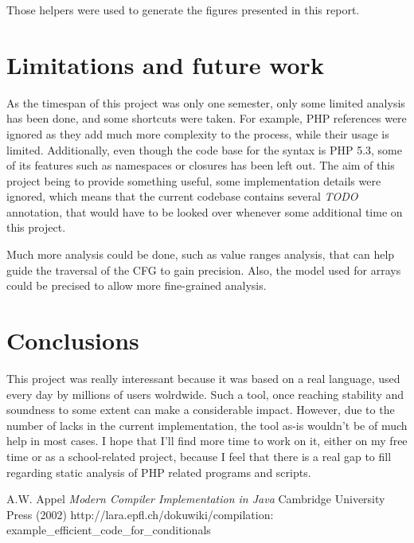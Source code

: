 \documentclass[a4paper]{article}
\begin{document}
Those helpers were used to generate the figures presented in this report.

\section{Limitations and future work}
As the timespan of this project was only one semester, only some limited
analysis has been done, and some shortcuts were taken. For example, PHP
references were ignored as they add much more complexity to the process, while
their usage is limited. Additionally, even though the code base for the syntax
is PHP 5.3, some of its features such as namespaces or closures has been left
out. The aim of this project being to provide something useful, some implementation
details were ignored, which means that the current codebase contains several
\emph{TODO} annotation, that would have to be looked over whenever some
additional time on this project.

Much more analysis could be done, such as value ranges analysis, that can help
guide the traversal of the CFG to gain precision. Also, the model used for
arrays could be precised to allow more fine-grained analysis.

\section{Conclusions}
This project was really interessant because it was based on a real language, used
every day by millions of users wolrdwide. Such a tool, once reaching stability
and soundness to some extent can make a considerable impact. However, due to the
number of lacks in the current implementation, the tool as-is wouldn't be of
much help in most cases. I hope that I'll find more time to work on it, either
on my free time or as a school-related project, because I feel that there is a
real gap to fill regarding static analysis of PHP related programs and scripts.

\begin{thebibliography}{99}
  A.W. Appel {\it Modern Compiler Implementation in Java}
    Cambridge University Press (2002)
  \mbox{http://lara.epfl.ch/dokuwiki/compilation:} \mbox{example\_efficient\_code\_for\_conditionals}
\end{thebibliography}
\end{document}
